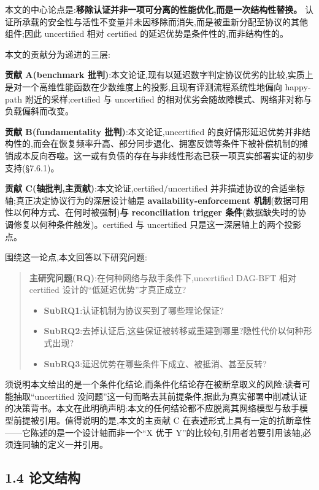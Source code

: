 \documentclass[UTF8,fontset=windows,a4paper,11pt]{ctexart}
\providecommand{\tightlist}{\setlength{\itemsep}{0pt}\setlength{\parskip}{0pt}}
\begin{document}
本文的中心论点是:\textbf{移除认证并非一项可分离的性能优化,而是一次结构性替换。}
认证所承载的安全性与活性不变量并未因移除而消失,而是被重新分配至协议的其他组件;因此
uncertified 相对 certified 的延迟优势是条件性的,而非结构性的。

本文的贡献分为递进的三层:

\textbf{贡献 A(benchmark
批判)}:本文论证,现有以延迟数字判定协议优劣的比较,实质上是对一个高维性能函数在少数维度上的投影,且现有评测流程系统性地偏向
happy-path 附近的采样;certified 与 uncertified
的相对优劣会随故障模式、网络非对称与负载偏斜而改变。

\textbf{贡献 B(fundamentality 批判)}:本文论证,uncertified
的良好情形延迟优势并非结构性的,而会在恢复频率升高、部分同步退化、拥塞反馈等条件下被补偿机制的摊销成本反向吞噬。这一或有负债的存在与非线性形态已获一项真实部署实证的初步支持(§7.6.1)。

\textbf{贡献 C(轴批判,主贡献)}:本文论证,certified/uncertified
并非描述协议的合适坐标轴;真正决定协议行为的深层设计轴是
\textbf{availability-enforcement
机制}(数据可用性以何种方式、在何时被强制)\textbf{与 reconciliation
trigger 条件}(数据缺失时的协调修复以何种条件触发)。certified 与
uncertified 只是这一深层轴上的两个投影点。

围绕这一论点,本文回答以下研究问题:

\begin{quote}
\textbf{主研究问题(RQ)}:在何种网络与敌手条件下,uncertified DAG-BFT 相对
certified 设计的``低延迟优势''才真正成立?

\begin{itemize}
\tightlist
\item
  \textbf{SubRQ1}:认证机制为协议买到了哪些理论保证?
\item
  \textbf{SubRQ2}:去掉认证后,这些保证被转移或重建到哪里?隐性代价以何种形式出现?
\item
  \textbf{SubRQ3}:延迟优势在哪些条件下成立、被抵消、甚至反转?
\end{itemize}
\end{quote}

须说明本文给出的是一个条件化结论,而条件化结论存在被断章取义的风险:读者可能抽取``uncertified
没问题''这一句而略去其前提条件,据此为真实部署中削减认证的决策背书。本文在此明确声明:本文的任何结论都不应脱离其网络模型与敌手模型前提被引用。值得说明的是,本文的主贡献
C 在表述形式上具有一定的抗断章性------它陈述的是一个设计轴而非一个``X
优于 Y''的比较句,引用者若要引用该轴,必须连同轴的定义一并引用。

\subsection{1.4 论文结构}\label{ux8bbaux6587ux7ed3ux6784}
\end{document}
